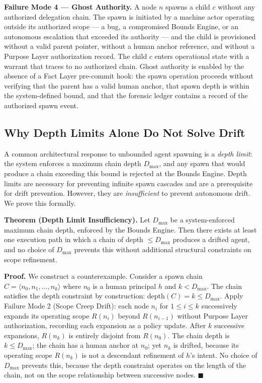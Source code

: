 \medskip
\noindent\textbf{Failure Mode 4 — Ghost Authority.}
A node $n$ spawns a child $c$ without any authorized delegation chain. The spawn is initiated by a machine actor operating outside its authorized scope — a bug, a compromised Bounds Engine, or an autonomous escalation that exceeded its authority — and the child is provisioned without a valid parent pointer, without a human anchor reference, and without a Purpose Layer authorization record. The child $c$ enters operational state with a warrant that traces to no authorized chain. Ghost authority is enabled by the absence of a Fact Layer pre-commit hook: the spawn operation proceeds without verifying that the parent has a valid human anchor, that spawn depth is within the system-defined bound, and that the forensic ledger contains a record of the authorized spawn event.

\subsection{Why Depth Limits Alone Do Not Solve Drift}

A common architectural response to unbounded agent spawning is a \emph{depth limit}: the system enforces a maximum chain depth $D_{\max}$, and any spawn that would produce a chain exceeding this bound is rejected at the Bounds Engine. Depth limits are necessary for preventing infinite spawn cascades and are a prerequisite for drift prevention. However, they are \emph{insufficient} to prevent autonomous drift. We prove this formally.

\medskip
\noindent\textbf{Theorem (Depth Limit Insufficiency).}
Let $D_{\max}$ be a system-enforced maximum chain depth, enforced by the Bounds Engine. Then there exists at least one execution path in which a chain of depth $\leq D_{\max}$ produces a drifted agent, and no choice of $D_{\max}$ prevents this without additional structural constraints on scope refinement.

\medskip
\noindent\textbf{Proof.} We construct a counterexample. Consider a spawn chain $C = \langle n_0, n_1, \ldots, n_k \rangle$ where $n_0$ is a human principal $h$ and $k < D_{\max}$. The chain satisfies the depth constraint by construction: $\mathrm{depth}(C) = k \leq D_{\max}$. Apply Failure Mode 2 (Scope Creep Drift): each node $n_i$ for $1 \leq i \leq k$ successively expands its operating scope $R(n_i)$ beyond $R(n_{i-1})$ without Purpose Layer authorization, recording each expansion as a policy update. After $k$ successive expansions, $R(n_k)$ is entirely disjoint from $R(n_0)$. The chain depth is $k \leq D_{\max}$; the chain has a human anchor at $n_0$; yet $n_k$ is drifted, because its operating scope $R(n_k)$ is not a descendant refinement of $h$'s intent. No choice of $D_{\max}$ prevents this, because the depth constraint operates on the length of the chain, not on the scope relationship between successive nodes. $\blacksquare$


